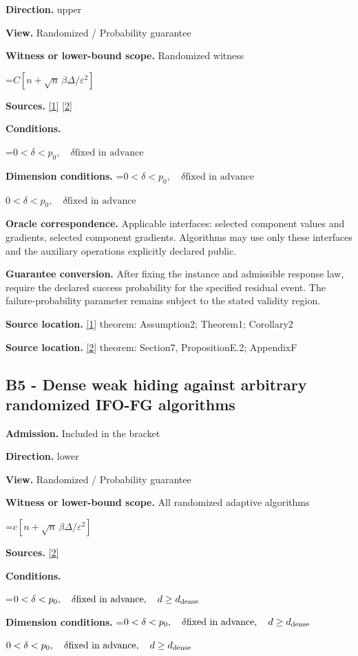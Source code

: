 \documentclass[10pt,a4paper]{article}
\newcommand{\AtlasMath}[1]{\par\begingroup\centering\setbox0=\hbox{$\displaystyle #1$}\ifdim\wd0>1.4\linewidth\typeout{ATLAS WIDE FORMULA: \the\wd0}\fi\ifdim\wd0>\linewidth\resizebox{\linewidth}{!}{\box0}\else\box0\fi\par\endgroup}
\newcommand{\AtlasInlineMath}[1]{\begingroup\setbox0=\hbox{$#1$}\ifdim\wd0>.4\linewidth\endgroup\AtlasMath{#1}\else\endgroup$#1$\fi}
\begin{document}
\textbf{Direction.} upper

\textbf{View.} Randomized / Probability guarantee

\textbf{Witness or lower-bound scope.} Randomized witness

\AtlasMath{C[n+\sqrt n\,\beta\Delta/\varepsilon^2]}
\textbf{Sources.} \href{https://proceedings.mlr.press/v139/li21a/li21a.pdf}{[1]} \href{https://arxiv.org/pdf/2609.00045v3}{[2]}

\textbf{Conditions.} 
\AtlasMath{0<\delta<p_0,\quad\delta\text{fixed in advance}}


\textbf{Dimension conditions.} \AtlasInlineMath{0<\delta<p_0,\quad\delta\text{fixed in advance}}

\textbf{Oracle correspondence.} Applicable interfaces: selected component values and gradients, selected component gradients. Algorithms may use only these interfaces and the auxiliary operations explicitly declared public.

\textbf{Guarantee conversion.} After fixing the instance and admissible response law, require the declared success probability for the specified residual event. The failure-probability parameter remains subject to the stated validity region.

\textbf{Source location.} \href{https://proceedings.mlr.press/v139/li21a/li21a.pdf}{[1]} theorem: Assumption2; Theorem1; Corollary2

\textbf{Source location.} \href{https://arxiv.org/pdf/2609.00045v3}{[2]} theorem: Section7, PropositionE.2; AppendixF

\subsection{B5 - Dense weak hiding against arbitrary randomized IFO-FG algorithms}
\textbf{Admission.} Included in the bracket

\textbf{Direction.} lower

\textbf{View.} Randomized / Probability guarantee

\textbf{Witness or lower-bound scope.} All randomized adaptive algorithms

\AtlasMath{c[n+\sqrt n\,\beta\Delta/\varepsilon^2]}
\textbf{Sources.} \href{https://arxiv.org/pdf/2609.00045v3}{[2]}

\textbf{Conditions.} 
\AtlasMath{0<\delta<p_0,\quad\delta\text{fixed in advance},\quad d\ge d_{\rm dense}}


\textbf{Dimension conditions.} \AtlasInlineMath{0<\delta<p_0,\quad\delta\text{fixed in advance},\quad d\ge d_{\rm dense}}
\end{document}
